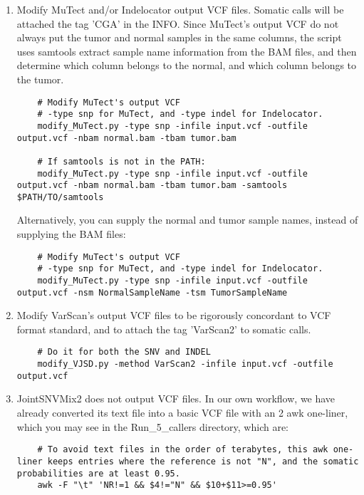 \documentclass[10pt,letterpaper]{article}
\begin{document}
	\begin{enumerate}

	\item 
	Modify MuTect and/or Indelocator output VCF files. Somatic calls will be attached the tag 'CGA' in the INFO. 
	Since MuTect's output VCF do not always put the tumor and normal samples in the same columns, the script uses samtools extract sample name information from the BAM files, and then determine which column belongs to the normal, and which column belongs to the tumor. 
	
	\begin{lstlisting}
	# Modify MuTect's output VCF
	# -type snp for MuTect, and -type indel for Indelocator.
	modify_MuTect.py -type snp -infile input.vcf -outfile output.vcf -nbam normal.bam -tbam tumor.bam
	
	# If samtools is not in the PATH:
	modify_MuTect.py -type snp -infile input.vcf -outfile output.vcf -nbam normal.bam -tbam tumor.bam -samtools $PATH/TO/samtools
	\end{lstlisting}
	
	Alternatively, you can supply the normal and tumor sample names, instead of supplying the BAM files:
	\begin{lstlisting}
	# Modify MuTect's output VCF
	# -type snp for MuTect, and -type indel for Indelocator.
	modify_MuTect.py -type snp -infile input.vcf -outfile output.vcf -nsm NormalSampleName -tsm TumorSampleName
	\end{lstlisting}

	\item
	Modify VarScan's output VCF files to be rigorously concordant to VCF format standard, and to attach the tag 'VarScan2' to somatic calls. 
	\begin{lstlisting}
	# Do it for both the SNV and INDEL
	modify_VJSD.py -method VarScan2 -infile input.vcf -outfile output.vcf
	\end{lstlisting}
	

	\item
	JointSNVMix2 does not output VCF files. In our own workflow, we have already converted its text file into a basic VCF file with an 2 awk one-liner, which you may see in the Run\_5\_callers directory, which are:

	\begin{lstlisting}
	# To avoid text files in the order of terabytes, this awk one-liner keeps entries where the reference is not "N", and the somatic probabilities are at least 0.95.
	awk -F "\t" 'NR!=1 && $4!="N" && $10+$11>=0.95'
	

\end{lstlisting}
\end{enumerate}
\end{document}
